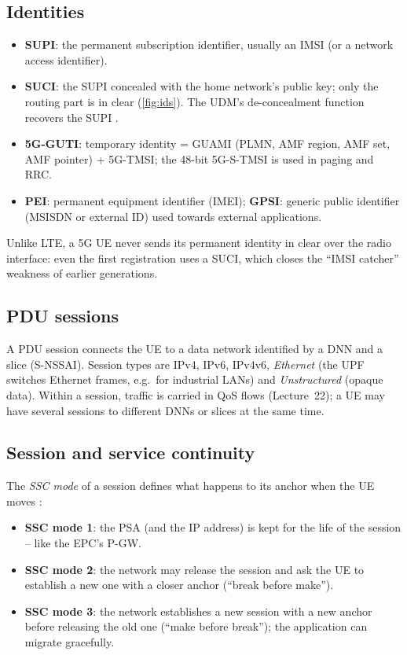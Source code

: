 \documentclass[11pt,a4paper]{article}
\begin{document}
\subsection{Identities}
\begin{itemize}
  \item \textbf{SUPI}: the permanent subscription identifier, usually an IMSI (or a network access identifier).
  \item \textbf{SUCI}: the SUPI concealed with the home network's public key; only the routing part is in clear
        (\cref{fig:ids}). The UDM's de-concealment function recovers the SUPI \cite{ts33501}.
  \item \textbf{5G-GUTI}: temporary identity = GUAMI (PLMN, AMF region, AMF set, AMF pointer) + 5G-TMSI; the 48-bit
        5G-S-TMSI is used in paging and RRC.
  \item \textbf{PEI}: permanent equipment identifier (IMEI); \textbf{GPSI}: generic public identifier (MSISDN or external ID)
        used towards external applications.
\end{itemize}
Unlike LTE, a 5G UE never sends its permanent identity in clear over the radio interface: even the first registration uses a
SUCI, which closes the ``IMSI catcher'' weakness of earlier generations.

\begin{acnfigure}
  \caption{Structure of the SUCI and of the 5G-GUTI.}
  \label{fig:ids}
\end{acnfigure}

\subsection{PDU sessions}
A PDU session connects the UE to a data network identified by a DNN and a slice (S-NSSAI). Session types are IPv4, IPv6,
IPv4v6, \emph{Ethernet} (the UPF switches Ethernet frames, e.g.\ for industrial LANs) and \emph{Unstructured} (opaque data).
Within a session, traffic is carried in QoS flows (Lecture~22); a UE may have several sessions to different DNNs or slices at
the same time.

\subsection{Session and service continuity}
The \emph{SSC mode} of a session defines what happens to its anchor when the UE moves \cite{ts23501}:
\begin{itemize}
  \item \textbf{SSC mode 1}: the PSA (and the IP address) is kept for the life of the session -- like the EPC's P-GW.
  \item \textbf{SSC mode 2}: the network may release the session and ask the UE to establish a new one with a closer anchor
        (``break before make'').
  \item \textbf{SSC mode 3}: the network establishes a new session with a new anchor before releasing the old one (``make
        before break''); the application can migrate gracefully.
\end{itemize}
\end{document}
